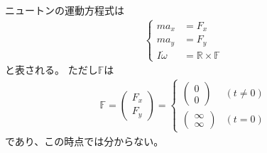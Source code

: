 \documentclass[a4paper,11pt]{jsarticle}
\begin{document}
ニュートンの運動方程式は
\begin{gather*}
  \begin{cases}
    m a_x &= F_x
    \\
    m a_y &= F_y
    \\
    I\dot{\omega} &= \mathbb{R} \times \mathbb{F}
  \end{cases}
\end{gather*}
と表される。
ただし$\mathbb{F}$は
\begin{gather*}
  \mathbb{F} = \begin{pmatrix}
    F_x
    \\
    F_y
  \end{pmatrix}
  = \begin{cases}
    \begin{pmatrix}
      0
      \\
      0
    \end{pmatrix} & (t\neq 0)
    \\
    \begin{pmatrix}
      \infty
      \\
      \infty
    \end{pmatrix} & (t = 0)
  \end{cases}
\end{gather*}
であり、この時点では分からない。
\end{document}
